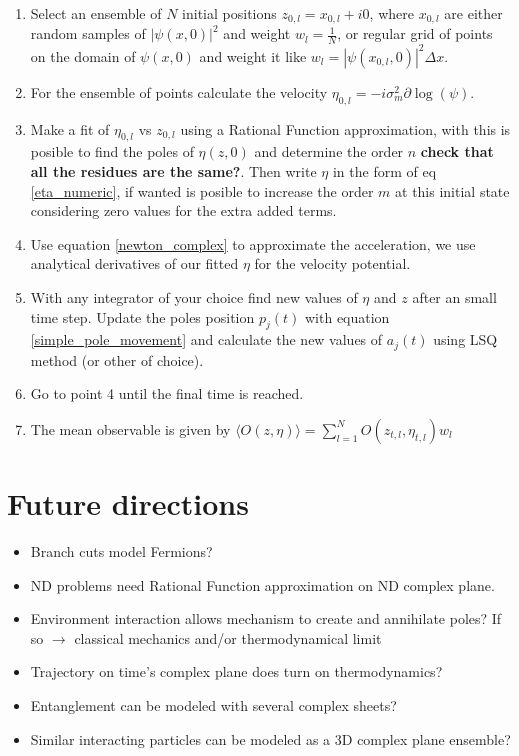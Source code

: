 \documentclass[a4paper,12pt]{article}
\begin{document}
\begin{enumerate}
\item Select an ensemble of $N$ initial positions $z_{0,l} = x_{0,l} + i0$, where $x_{0,l}$ are either random samples of $|\psi(x,0)|^2$ and weight $w_l=\frac{1}{N}$, or regular grid of points on the domain of $\psi(x,0)$ and weight it like $w_l= |\psi(x_{0,l},0)|^2 \Delta x$.
\item For the ensemble of points calculate the velocity $\eta_{0,l} = -i \sigma_m^2 \partial \log(\psi)$.
\item Make a fit of $\eta_{0,l}$ vs $z_{0,l}$ using a Rational Function approximation, with this is posible to find the poles of $\eta(z,0)$
and determine the order $n$ {\bf check that all the residues are the same?}. Then write $\eta$ in the form of eq \ref{eta_numeric},
 if wanted is posible to increase the order $m$ at this initial state considering zero values for the extra added terms.
\item Use equation \ref{newton_complex} to approximate the acceleration, we use analytical derivatives of our fitted $\eta$ for the
velocity potential.
\item With any integrator of your choice find new values of $\eta$ and $z$ after an small time step. Update the poles position $p_j(t)$ with equation \ref{simple_pole_movement} and calculate the new values of $a_j(t)$  using LSQ method (or other of choice).
\item Go to point 4 until the final time is reached.
\item  The mean observable is given by $\langle O(z,\eta) \rangle = \sum_{l=1}^{N} O(z_{t,l}, \eta_{t,l}) w_l$ 
\end{enumerate}



\section{Future directions}

\begin{itemize}
\item Branch cuts model Fermions?
\item ND problems need Rational Function approximation on ND complex plane.
\item Environment interaction allows mechanism to create and annihilate poles? If so $\rightarrow$ classical mechanics and/or thermodynamical limit
\item Trajectory on time's complex plane does turn on thermodynamics?
\item Entanglement can be modeled with several complex sheets?
\item Similar interacting particles can be modeled as a 3D complex plane ensemble? 
\end{itemize}


\printbibliography
\end{document}
